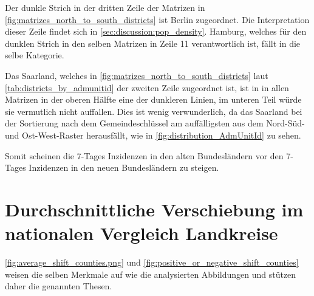 Der dunkle Strich in der dritten Zeile der Matrizen in \autoref{fig:matrizes_north_to_south_districts} ist Berlin zugeordnet. Die Interpretation dieser Zeile findet sich in \autoref{sec:discussion:pop_density}. Hamburg, welches für den dunklen Strich in den selben Matrizen in Zeile 11 verantwortlich ist, fällt in die selbe Kategorie.

Das Saarland, welches in \autoref{fig:matrizes_north_to_south_districts} laut \autoref{tab:districts_by_admunitid} der zweiten Zeile zugeordnet ist, ist in in allen Matrizen in der oberen Hälfte eine der dunkleren Linien, im unteren Teil würde sie vermutlich nicht auffallen.
Dies ist wenig verwunderlich, da das Saarland bei der Sortierung nach dem Gemeindeschlüssel am auffälligsten aus dem Nord-Süd- und Ost-West-Raster herausfällt, wie in \autoref{fig:distribution_AdmUnitId} zu sehen.

Somit scheinen die 7-Tages Inzidenzen in den alten Bundesländern vor den 7-Tages Inzidenzen in den neuen Bundesländern zu steigen.


\section{Durchschnittliche Verschiebung im nationalen Vergleich Landkreise}
\autoref{fig:average_shift_counties.png} und
\autoref{fig:positive_or_negative_shift_counties} weisen die selben Merkmale auf wie die analysierten Abbildungen  und stützen daher die genannten Thesen.
